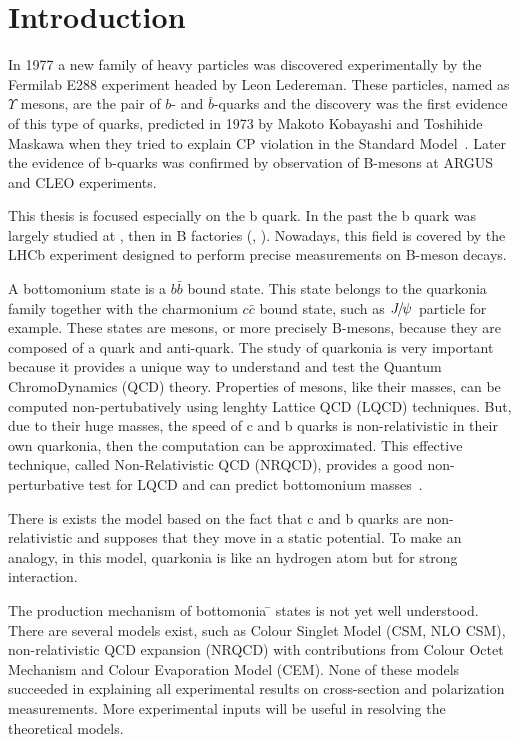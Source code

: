 \chapter{Introduction}
In 1977 a new family of heavy particles was discovered experimentally by the
Fermilab E288 experiment headed by Leon Ledereman\cite{Herb:1977ek}. These
particles, named as $\Upsilon$ mesons, are the pair of $b$- and
$\bar{b}$-quarks and the discovery was the first evidence of this type of
quarks, predicted in 1973 by Makoto Kobayashi and Toshihide Maskawa when they
tried to explain CP violation in the Standard Model~\cite{Kobayashi:1973fv}.
Later the evidence of b-quarks was confirmed by observation of B-mesons at
ARGUS\cite{Albrecht:1986nr} and CLEO\cite{Bebek:1987bp} experiments.

This thesis is focused especially on the b quark. In the past the b
quark was largely studied at \lep, \tevatron then in B factories (\babar, \belle).
Nowadays, this field is covered by the LHCb experiment designed to perform
precise measurements on B-meson decays.

A bottomonium state is a $b\bar{b}$ bound state. This state belongs to the
quarkonia family together with the charmonium $c\bar{c}$ bound
state, such as ${{J\mskip -3mu/\mskip -2mu\psi\mskip 2mu}}$ particle for example. These states are mesons, or more
precisely B-mesons, because they are composed of a quark and anti-quark. The
study of quarkonia is very important because it provides a unique way to
understand and test the Quantum ChromoDynamics (QCD) theory. Properties of
mesons, like their masses, can be computed non-pertubatively using lenghty
Lattice QCD (LQCD) techniques. But, due to their huge masses, the speed of c
and b quarks is non-relativistic in their own quarkonia, then the computation
can be approximated. This effective technique, called Non-Relativistic QCD
(NRQCD), provides a good non-perturbative test for LQCD and can predict
bottomonium masses~\cite{Dowdall:2011iy,Dowdall:2012ab}.

There is exists the model based on the fact that c and b quarks are
non-relativistic and supposes that they move in a static
potential\cite{Kulshreshtha:1984mw,Parmar:2010ii,shah}. To make an analogy,
in this model, quarkonia is like an hydrogen atom but for strong interaction.

The production mechanism of bottomonia ̄ states is not yet well understood.
There are several models exist, such as Colour Singlet Model (CSM, NLO CSM),
non-relativistic QCD expansion (NRQCD) with contributions from Colour Octet
Mechanism and Colour Evaporation Model (CEM). None of these models succeeded in
explaining all experimental results on cross-section and polarization measurements.
More experimental inputs will be useful in resolving the theoretical models.

